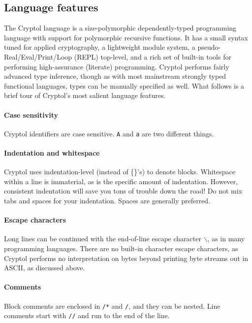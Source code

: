 \subsection{Language features}
\label{sec:language-features}

The Cryptol language is a size-polymorphic dependently-typed
programming language with support for polymorphic recursive functions.
It has a small syntax tuned for applied cryptography, a lightweight
module system, a pseudo-Real/Eval/Print/Loop (REPL) top-level, and a
rich set of built-in tools for performing high-assurance (literate)
programming.  Cryptol performs fairly advanced type inference, though
as with most mainstream strongly typed functional languages, types can
be manually specified as well.  What follows is a brief tour of
Cryptol's most salient language features.

\paragraph*{Case sensitivity} 
Cryptol identifiers are case sensitive. {\tt A} and {\tt a} are two
different things.\indCaseSensitive

\paragraph*{Indentation and whitespace} 
Cryptol uses indentation-level (instead of \{\}'s) to denote blocks.
Whitespace within a line is immaterial, as is the specific amount of
indentation.  However, consistent indentation will save you tons of
trouble down the road!  Do not mix tabs and spaces for your
indentation.  Spaces are generally preferred.

\paragraph*{Escape characters}
Long lines can be continued with the end-of-line escape character
\texttt{$\backslash$}, as in many programming languages.\indLineCont
There are no built-in character escape characters, as Cryptol performs
no interpretation on bytes beyond printing byte streams out in ASCII,
as discussed above.

\paragraph*{Comments}\indComments
Block comments are enclosed in {\tt /*} and {\tt */}, and they can be
nested. Line comments start with {\tt //} and run to the end of the
line.

